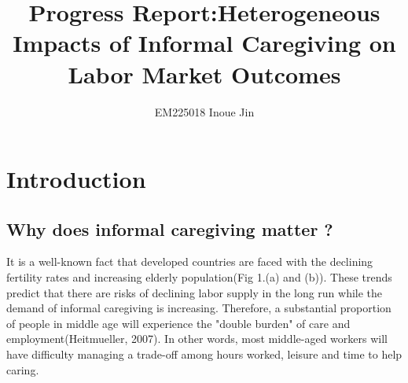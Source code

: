 \documentclass{article}
\theoremstyle{definition}
\begin{document}
\title{Progress Report:Heterogeneous Impacts of Informal Caregiving on Labor Market Outcomes}
\author{EM225018 Inoue Jin}
\maketitle

\section{Introduction}
\subsection{Why does informal caregiving matter ?}

It is a well-known fact that developed countries are faced with the declining fertility rates and increasing elderly population(Fig 1.(a) and (b)). These trends predict that there are risks of declining labor supply in the long run while the demand of informal caregiving is increasing. Therefore, a substantial proportion of people in middle age will experience the "double burden" of care and employment(Heitmueller, 2007). In other words, most middle-aged workers will have difficulty managing a trade-off among hours worked, leisure and time to help caring. 
\end{document}
